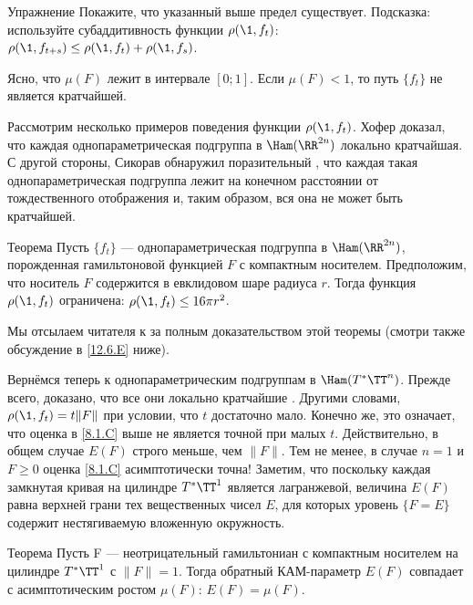 \begin{thm*}{Упражнение}
Покажите, что указанный выше предел существует.
Подсказка: используйте субаддитивность функции $\rho (\1, f_t)$: $\rho (\1, f_{t + s}) \le \rho (\1, f_t) + \rho (\1, f_s)$.
\end{thm*}

Ясно, что $\mu (F)$ лежит в интервале $[0; 1]$.
Если $\mu (F) <1$, то путь $\{f_t\}$ не является кратчайшей.

Рассмотрим несколько примеров поведения функции $\rho (\1, f_t)$.
Хофер \cite{H2} доказал, что каждая однопараметрическая подгруппа в $\Ham (\RR^{2n})$ локально кратчайшая.
С другой стороны, Сикорав \cite{S2} обнаружил поразительный , что каждая такая однопараметрическая подгруппа лежит на конечном расстоянии от тождественного отображения и, таким образом, вся она не может быть кратчайшей.

\begin{thm}{Теорема}\label{8.2.A}
Пусть $\{f_t\}$ --- однопараметрическая подгруппа в $\Ham (\RR^{2n})$, порожденная гамильтоновой функцией $F$ с компактным носителем.
Предположим, что носитель $F$ содержится в евклидовом шаре радиуса $r$.
Тогда функция $\rho (\1, f_t)$ ограничена: $\rho (\1, f_t) \le 16\pi r^2$.
\end{thm}

Мы отсылаем читателя к \cite[с. 177]{HZ} за полным доказательством этой теоремы (смотри также обсуждение в \ref{12.6.E} ниже).

Вернёмся теперь к однопараметрическим подгруппам в $\Ham (T^\ast \TT^n)$.
Прежде всего, доказано, что все они локально кратчайшие \cite{LM2}.
Другими словами, $\rho (\1, f_t) = t \| F \|$ при условии, что $t$ достаточно мало.
Конечно же, это означает, что оценка в \ref{8.1.C} выше не является точной при малых $t$.
Действительно, в общем случае $E (F)$ строго меньше, чем $\| F \|$.
Тем не менее, в случае $n = 1$ и $F \ge 0$ оценка \ref{8.1.C} асимптотически точна!
Заметим, что поскольку каждая замкнутая кривая на цилиндре $T^\ast \TT^1$ является лагранжевой, величина $E (F)$ равна верхней грани тех вещественных чисел $E$, для которых уровень $\{F = E\}$ содержит нестягиваемую вложенную окружность.

\begin{thm}[(\cite{PS})]{Теорема}\label{8.2.B}
Пусть F --- неотрицательный гамильтониан с компактным носителем на цилиндре $T^\ast \TT^1$ с $\| F \| = 1$.
Тогда обратный КАМ-параметр $E (F)$ совпадает с асимптотическим ростом $\mu (F)$: $E (F) = \mu (F)$.
\end{thm}


